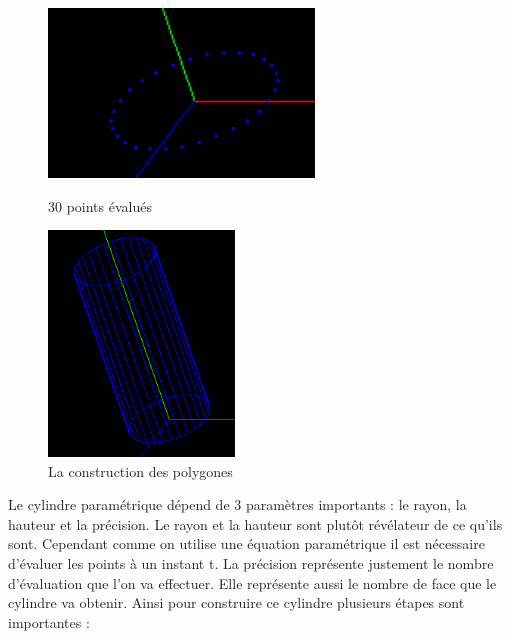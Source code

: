 \documentclass{article}
\begin{document}
\begin{figure}[!htb]
	\begin{minipage}{0.5\textwidth}
    	\centering
    	\includegraphics[height=4.5cm]{./assets/cylindre_para_0.png}
		\caption{30 points évalués}
    	\label{fig:cylindre_para_0}
	\end{minipage}
	\hfill
	\begin{minipage}{0.5\textwidth}
    	\centering
    	\includegraphics[height=6cm]{./assets/cylindre_para_1.png}
    	\caption{La construction des polygones}
    	\label{fig:cylindre_para_1}
	\end{minipage}
\end{figure}

Le cylindre paramétrique dépend de 3 paramètres importants : le rayon, la hauteur et la précision. Le rayon et la hauteur sont plutôt révélateur de ce qu'ils sont. Cependant comme on utilise une équation paramétrique il est nécessaire d'évaluer les points à un instant t. La précision représente justement le nombre d'évaluation que l'on va effectuer. Elle représente aussi le nombre de face que le cylindre va obtenir. 
\newline
\newline
Ainsi pour construire ce cylindre plusieurs étapes sont importantes :
\end{document}
